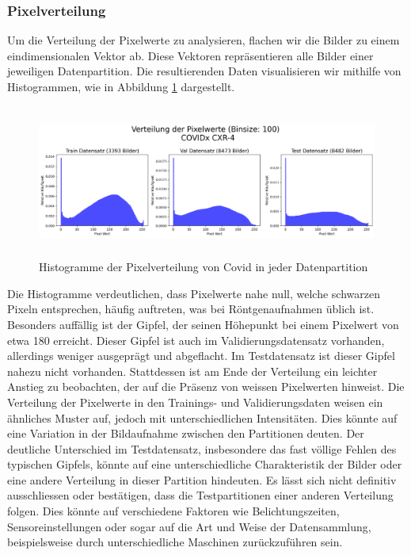 
\subsubsection{Pixelverteilung} \label{chap:Pixelverteilung-TestProblemEda1-covidx}

Um die Verteilung der Pixelwerte zu analysieren, flachen wir die Bilder zu einem eindimensionalen Vektor ab. Diese Vektoren repräsentieren alle Bilder einer jeweiligen Datenpartition. Die resultierenden Daten visualisieren wir mithilfe von Histogrammen, wie in Abbildung \ref{fig:hist-datapartition-covid} dargestellt.

\begin{figure}[ht]
    \centering
    \includegraphics[width=\linewidth, height=5cm]{01-images/03-data/covid-Pixelverteilung-Partitionen.png}
    \caption{Histogramme der Pixelverteilung von Covid in jeder Datenpartition}
    \label{fig:hist-datapartition-covid}
\end{figure}

Die Histogramme verdeutlichen, dass Pixelwerte nahe null, welche schwarzen Pixeln entsprechen, häufig auftreten, was bei Röntgenaufnahmen üblich ist. Besonders auffällig ist der Gipfel, der seinen Höhepunkt bei einem Pixelwert von etwa 180 erreicht. Dieser Gipfel ist auch im Validierungsdatensatz vorhanden, allerdings weniger ausgeprägt und abgeflacht. Im Testdatensatz ist dieser Gipfel nahezu nicht vorhanden. Stattdessen ist am Ende der Verteilung ein leichter Anstieg zu beobachten, der auf die Präsenz von weissen Pixelwerten hinweist. Die Verteilung der Pixelwerte in den Trainings- und Validierungsdaten weisen ein ähnliches Muster auf, jedoch mit unterschiedlichen Intensitäten. Dies könnte auf eine Variation in der Bildaufnahme  zwischen den Partitionen deuten. Der deutliche Unterschied im Testdatensatz, insbesondere das fast völlige Fehlen des typischen Gipfels, könnte auf eine unterschiedliche Charakteristik der Bilder oder eine andere Verteilung in dieser Partition hindeuten. Es lässt sich nicht definitiv ausschliessen oder bestätigen, dass die Testpartitionen einer anderen Verteilung folgen. Dies könnte auf verschiedene Faktoren wie Belichtungszeiten, Sensoreinstellungen oder sogar auf die Art und Weise der Datensammlung, beispielsweise durch unterschiedliche Maschinen zurückzuführen sein.

